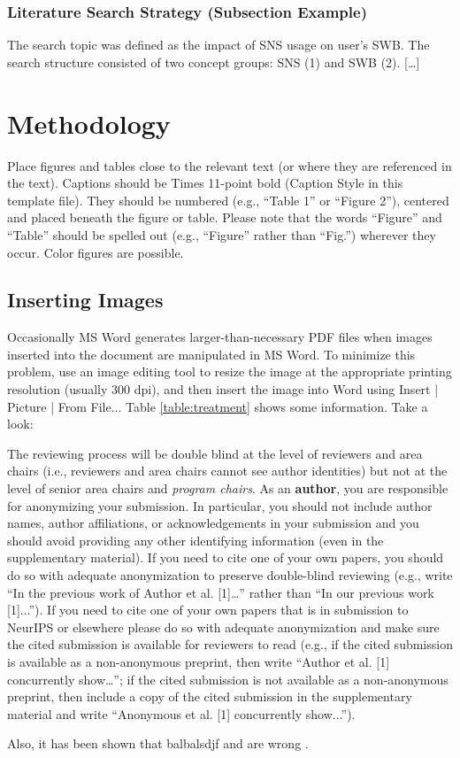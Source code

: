 \documentclass[11pt]{article}
\begin{document}
\subsubsection{Literature Search Strategy (Subsection Example)}
The search topic was defined as the impact of SNS usage on user’s SWB. The search structure consisted of two concept groups: SNS (1) and SWB (2). […]

\section{Methodology}
Place figures and tables close to the relevant text (or where they are referenced in the text).
Captions should be Times 11-point bold (Caption Style in this template file). They should be numbered (e.g., ``Table 1'' or “Figure 2”), centered and placed beneath the figure or table. Please note that the words “Figure” and “Table” should be spelled out (e.g., “Figure” rather than “Fig.”) wherever they occur.
Color figures are possible.
\subsection{Inserting Images}
Occasionally MS Word generates larger-than-necessary PDF files when images inserted into the document are manipulated in MS Word. To minimize this problem, use an image editing tool to resize the image at the appropriate printing resolution (usually 300 dpi), and then insert the image into Word using Insert | Picture | From File...
\newline
Table \ref{table:treatment} shows some information. Take a look:


The reviewing process will be double blind at the level of reviewers and area chairs (i.e., reviewers and area chairs cannot see author identities) but not at the level of senior area chairs and \emph{program chairs}. As an \textbf{author}, you are responsible for anonymizing your submission. In particular, you should not include author names, author affiliations, or acknowledgements in your submission and you should avoid providing any other identifying information (even in the supplementary material). If you need to cite one of your own papers, you should do so with adequate anonymization to preserve double-blind reviewing (e.g., write “In the previous work of Author et al. [1]…” rather than “In our previous work [1]...”). If you need to cite one of your own papers that is in submission to NeurIPS or elsewhere please do so with adequate anonymization and make sure the cited submission is available for reviewers to read (e.g., if the cited submission is available as a non-anonymous preprint, then write “Author et al. [1] concurrently show…”; if the cited submission is not available as a non-anonymous preprint, then include a copy of the cited submission in the supplementary material and write “Anonymous et al. [1] concurrently show...”).

Also, it has been shown that balbalsdjf and  are wrong \cite{chua1993cnn}.

\newpage
{}

\end{document}
